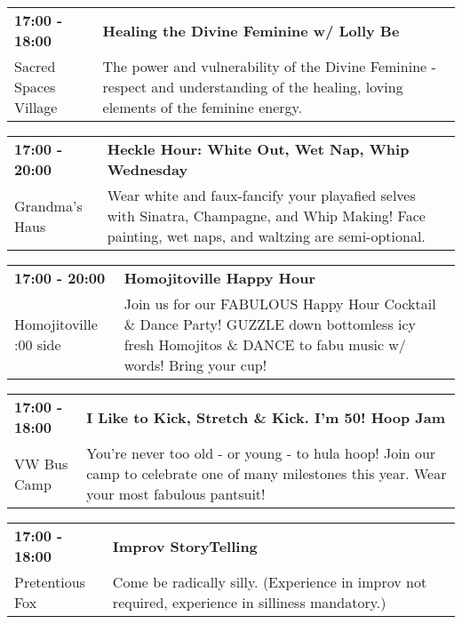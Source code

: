 \begin{tabular}{ p{1in} p{2.2in} }
    \textbf{17:00 - 18:00} & \textbf{ Healing the Divine Feminine w/ Lolly Be} \\
    Sacred Spaces Village \newline  & The power and vulnerability of the Divine Feminine - respect and understanding of the healing, loving elements of the feminine energy. \\
    \hline 
\end{tabular}
    
\begin{tabular}{ p{1in} p{2.2in} }
    \textbf{17:00 - 20:00} & \textbf{Heckle Hour: White Out, Wet Nap, Whip Wednesday} \\
    Grandma's Haus \newline  & Wear white and faux-fancify your playafied selves with Sinatra, Champagne, and Whip Making! Face painting, wet naps, and waltzing are semi-optional. \\
    \hline 
\end{tabular}
    
\begin{tabular}{ p{1in} p{2.2in} }
    \textbf{17:00 - 20:00} & \textbf{Homojitoville Happy Hour} \\
    Homojitoville \newline 9:00 side & Join us for our FABULOUS Happy Hour Cocktail \& Dance Party! GUZZLE down bottomless icy fresh Homojitos \& DANCE to fabu music w/ words! Bring your cup! \\
    \hline 
\end{tabular}
    
\begin{tabular}{ p{1in} p{2.2in} }
    \textbf{17:00 - 18:00} & \textbf{I Like to Kick, Stretch \& Kick. I'm 50! Hoop Jam} \\
    VW Bus Camp \newline  & You're never too old - or young - to hula hoop!  Join our camp to celebrate one of many milestones this year.  Wear your most fabulous pantsuit! \\
    \hline 
\end{tabular}
    
\begin{tabular}{ p{1in} p{2.2in} }
    \textbf{17:00 - 18:00} & \textbf{Improv StoryTelling} \\
    Pretentious Fox \newline  & Come be radically silly. (Experience in improv not required, experience in silliness mandatory.) \\
    \hline 
\end{tabular}
    
